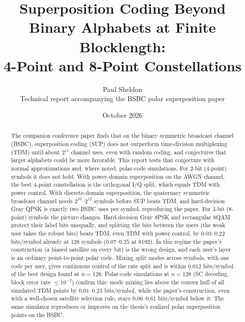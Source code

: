 \documentclass[11pt]{article}
\title{Superposition Coding Beyond Binary Alphabets at Finite Blocklength:\\ 4-Point and 8-Point Constellations}
\author{Paul Sheldon\\ \small Technical report accompanying the BSBC polar superposition paper}
\date{October 2026}
\begin{document}
\sloppy
\maketitle

\begin{abstract}
The companion conference paper finds that on the binary symmetric broadcast channel (BSBC), superposition coding (SUP) does not outperform time-division multiplexing (TDM) until about $2^{11}$ channel uses, even with random coding, and conjectures that larger alphabets could be more favorable. This report tests that conjecture with normal approximations and, where noted, polar-code simulations. For 2-bit (4-point) symbols it does not hold. With power-domain superposition on the AWGN channel, the best 4-point constellation is the orthogonal I/Q split, which equals TDM with power control. With discrete-domain superposition, the quaternary symmetric broadcast channel needs $2^{10}$--$2^{12}$ symbols before SUP beats TDM, and hard-decision Gray QPSK is exactly two BSBC uses per symbol, reproducing the paper. For 3-bit (8-point) symbols the picture changes. Hard-decision Gray 8PSK and rectangular 8QAM protect their label bits unequally, and splitting the bits between the users (the weak user takes the robust bits) beats TDM, even TDM with power control, by $0.03$--$0.22$ bits/symbol already at 128 symbols ($0.07$--$0.25$ at 8192). In this regime the paper's construction (a biased satellite on every bit) is the wrong design, and each user's layer is an ordinary point-to-point polar code. Mixing split modes across symbols, with one code per user, gives continuous control of the rate split and is within $0.012$ bits/symbol of the best design found at $n=128$. Polar-code simulations at $n=128$ (SC decoding, block error rate $\le10^{-2}$) confirm this: mode mixing lies above the convex hull of all simulated TDM points by $0.01$--$0.23$ bits/symbol, while the paper's construction, even with a well-chosen satellite selection rule, stays $0.06$--$0.61$ bits/symbol below it. The same simulator reproduces or improves on the thesis's realized polar superposition points on the BSBC.
\end{abstract}
\end{document}
